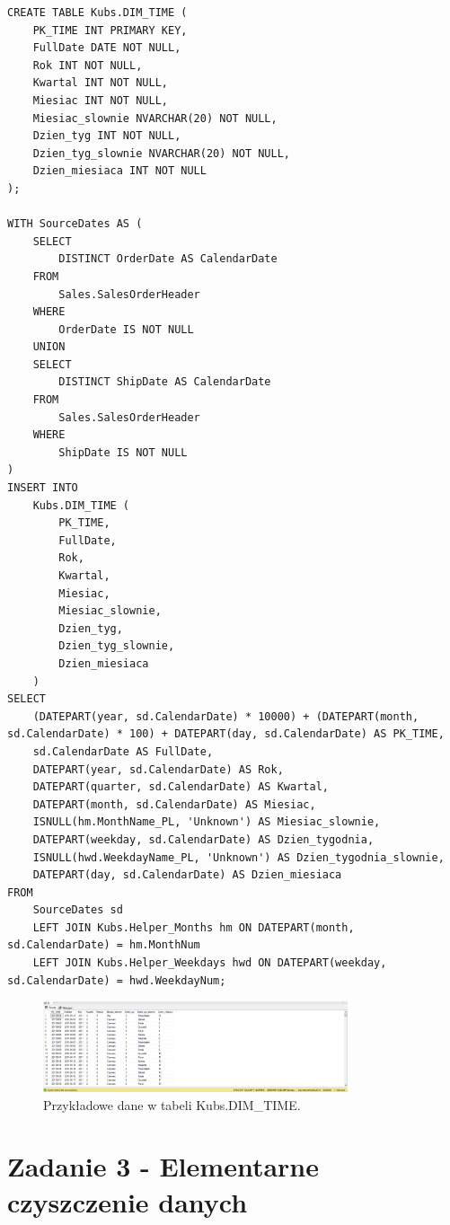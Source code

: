 \documentclass[a4paper,12pt]{article}
\begin{document}
\begin{lstlisting}[caption={Tworzenie i wypełnianie tabeli DIM\_TIME.}, label=lst:zad2_dim_time]
CREATE TABLE Kubs.DIM_TIME (
    PK_TIME INT PRIMARY KEY,
    FullDate DATE NOT NULL,
    Rok INT NOT NULL,
    Kwartal INT NOT NULL,
    Miesiac INT NOT NULL,
    Miesiac_slownie NVARCHAR(20) NOT NULL,
    Dzien_tyg INT NOT NULL,
    Dzien_tyg_slownie NVARCHAR(20) NOT NULL,
    Dzien_miesiaca INT NOT NULL
);

WITH SourceDates AS (
    SELECT
        DISTINCT OrderDate AS CalendarDate
    FROM
        Sales.SalesOrderHeader
    WHERE
        OrderDate IS NOT NULL
    UNION
    SELECT
        DISTINCT ShipDate AS CalendarDate
    FROM
        Sales.SalesOrderHeader
    WHERE
        ShipDate IS NOT NULL
)
INSERT INTO
    Kubs.DIM_TIME (
        PK_TIME,
        FullDate,
        Rok,
        Kwartal,
        Miesiac,
        Miesiac_slownie,
        Dzien_tyg,
        Dzien_tyg_slownie,
        Dzien_miesiaca
    )
SELECT
    (DATEPART(year, sd.CalendarDate) * 10000) + (DATEPART(month, sd.CalendarDate) * 100) + DATEPART(day, sd.CalendarDate) AS PK_TIME,
    sd.CalendarDate AS FullDate,
    DATEPART(year, sd.CalendarDate) AS Rok,
    DATEPART(quarter, sd.CalendarDate) AS Kwartal,
    DATEPART(month, sd.CalendarDate) AS Miesiac,
    ISNULL(hm.MonthName_PL, 'Unknown') AS Miesiac_slownie,
    DATEPART(weekday, sd.CalendarDate) AS Dzien_tygodnia,
    ISNULL(hwd.WeekdayName_PL, 'Unknown') AS Dzien_tygodnia_slownie,
    DATEPART(day, sd.CalendarDate) AS Dzien_miesiaca
FROM
    SourceDates sd
    LEFT JOIN Kubs.Helper_Months hm ON DATEPART(month, sd.CalendarDate) = hm.MonthNum
    LEFT JOIN Kubs.Helper_Weekdays hwd ON DATEPART(weekday, sd.CalendarDate) = hwd.WeekdayNum;
\end{lstlisting}

\begin{figure}[H]
    \centering
    \includegraphics[width=0.8\textwidth]{images/2_time_rows.png}
    \caption{Przykładowe dane w tabeli Kubs.DIM\_TIME.}
    \label{fig:dim_time_data}
\end{figure}

\section{Zadanie 3 - Elementarne czyszczenie danych}
\end{document}
